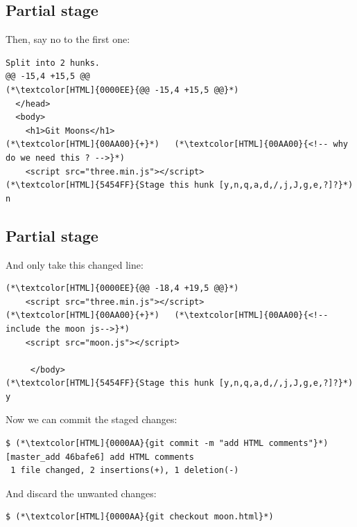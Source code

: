 \subsection{Partial stage}
\begin{frame}[fragile]
  \subslidetitle

  Then, say no to the first one:
  \begin{lstlisting}
Split into 2 hunks.
@@ -15,4 +15,5 @@
(*\textcolor[HTML]{0000EE}{@@ -15,4 +15,5 @@}*)
  </head>
  <body>
    <h1>Git Moons</h1>
(*\textcolor[HTML]{00AA00}{+}*)   (*\textcolor[HTML]{00AA00}{<!-- why do we need this ? -->}*)
    <script src="three.min.js"></script>
(*\textcolor[HTML]{5454FF}{Stage this hunk [y,n,q,a,d,/,j,J,g,e,?]?}*) n
\end{lstlisting}
\end{frame}

\subsection{Partial stage}
\begin{frame}[fragile]
  \subslidetitle
  And only take this changed line:
  \begin{lstlisting}
(*\textcolor[HTML]{0000EE}{@@ -18,4 +19,5 @@}*)
    <script src="three.min.js"></script>
(*\textcolor[HTML]{00AA00}{+}*)   (*\textcolor[HTML]{00AA00}{<!--include the moon js-->}*)
    <script src="moon.js"></script>

     </body>
(*\textcolor[HTML]{5454FF}{Stage this hunk [y,n,q,a,d,/,j,J,g,e,?]?}*) y
\end{lstlisting}

  Now we can commit the staged changes:
  \begin{lstlisting}
$ (*\textcolor[HTML]{0000AA}{git commit -m "add HTML comments"}*)
[master_add 46bafe6] add HTML comments
 1 file changed, 2 insertions(+), 1 deletion(-)
\end{lstlisting}

  And discard the unwanted changes:
  \begin{lstlisting}
$ (*\textcolor[HTML]{0000AA}{git checkout moon.html}*)
\end{lstlisting}
\end{frame}


